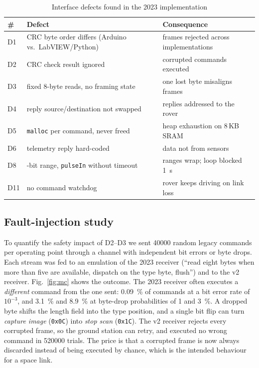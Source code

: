 \documentclass[conference]{IEEEtran}
\begin{document}
\begin{table}[t]
\centering
\caption{Interface defects found in the 2023 implementation}
\label{tab:defects}
\footnotesize
\setlength{\tabcolsep}{3pt}
\begin{tabular}{@{}p{0.6cm}>{\raggedright\arraybackslash}p{3.5cm}>{\raggedright\arraybackslash}p{3.6cm}@{}}
\toprule
\# & Defect & Consequence \\
\midrule
D1 & CRC byte order differs (Arduino vs.\ LabVIEW/Python) & frames rejected across implementations \\
D2 & CRC check result ignored & corrupted commands executed \\
D3 & fixed 8-byte reads, no framing state & one lost byte misaligns frames \\
D4 & reply source/destination not swapped & replies addressed to the rover \\
D5 & \texttt{malloc} per command, never freed & heap exhaustion on 8\,KB SRAM \\
D6 & telemetry reply hard-coded & data not from sensors \\
D8 & 8-bit range, \texttt{pulseIn} without timeout & ranges wrap; loop blocked \SI{1}{\second} \\
D11 & no command watchdog & rover keeps driving on link loss \\
\bottomrule
\end{tabular}
\end{table}

\subsection{Fault-injection study}
To quantify the safety impact of D2--D3 we sent \num{40000} random legacy commands per operating point through a channel with independent bit errors or byte drops. Each stream was fed to an emulation of the 2023 receiver (``read eight bytes when more than five are available, dispatch on the type byte, flush'') and to the v2 receiver. Fig.~\ref{fig:mc} shows the outcome. The 2023 receiver often executes a \emph{different} command from the one sent: \SI{0.09}{\percent} of commands at a bit error rate of $10^{-3}$, and \SI{3.1}{\percent} and \SI{8.9}{\percent} at byte-drop probabilities of 1 and \SI{3}{\percent}. A dropped byte shifts the length field into the type position, and a single bit flip can turn \emph{capture image} (\texttt{0x0C}) into \emph{stop scan} (\texttt{0x1C}). The v2 receiver rejects every corrupted frame, so the ground station can retry, and executed no wrong command in \num{520000} trials. The price is that a corrupted frame is now always discarded instead of being executed by chance, which is the intended behaviour for a space link.
\end{document}
